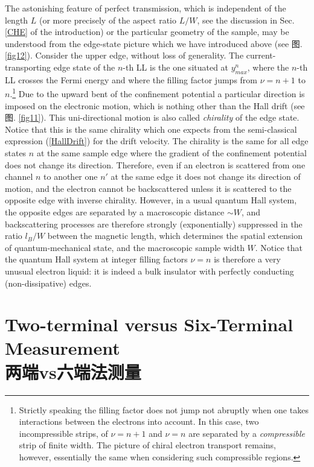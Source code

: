 \documentclass[10pt]{book}
\begin{document}
The astonishing feature of perfect transmission, 
which is independent of the length $L$ (or more precisely of the aspect ratio $L/W$, see the
discussion in Sec. \ref{CHE} of the introduction) or the particular geometry of the sample, may be understood from the 
edge-state picture which we have introduced above (see 图. \ref{fig12}). Consider the upper edge, without loss of 
generality. The current-transporting edge state
of the $n$-th LL is the one situated at $y_{max}^n$, where the $n$-th LL crosses the Fermi energy and where the 
filling factor jumps from $\nu= n+1$ to $n$.\footnote{Strictly speaking the filling factor does not jump not abruptly when one
takes interactions between the electrons into account. In this case, two incompressible strips, of $\nu=n+1$ and $\nu=n$
are separated by a {\sl compressible} strip of finite width. %
The picture of chiral electron transport remains, however, essentially the same when considering such compressible regions.} 
Due to the upward bent of the confinement potential a particular direction is imposed on
the electronic motion, which is nothing other than the Hall drift (see 图. \ref{fig11}). This uni-directional motion
is also called 
{\sl chirality} of the edge state. Notice that this is the same chirality which one expects from the semi-classical 
expression (\ref{HallDrift}) for the drift velocity.
The chirality is the same for all edge states $n$ at the same sample edge where
the gradient of the confinement potential does not change its direction. Therefore, even if an electron is scattered
from one channel $n$ to another one $n'$ at the same edge it does not change its direction of motion, and the electron
cannot be backscattered unless it is scattered to the opposite edge with inverse chirality. However, in a usual quantum
Hall system, the opposite edges are separated by a macroscopic distance $\sim W$, and backscattering processes are therefore
strongly (exponentially) suppressed in the ratio $l_B/W$ between the magnetic length, which determines the 
spatial extension of quantum-mechanical state, and the macroscopic sample width $W$. Notice that the quantum Hall system at 
integer filling factors $\nu=n$ is therefore a very unusual electron liquid: it is indeed a bulk insulator with perfectly
conducting (non-dissipative) edges.




\section[两端vs六端法测量]{Two-terminal versus Six-Terminal Measurement\\\bf 两端vs六端法测量}
\label{4term}
\end{document}
